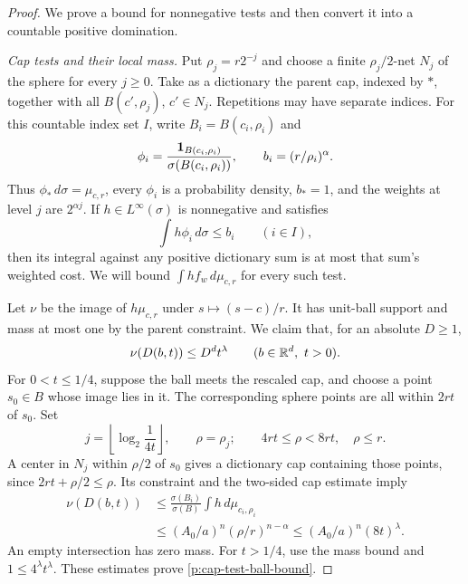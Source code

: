 \begin{proof}
We prove a bound for nonnegative tests and then convert it into a
countable positive domination.

\smallskip\noindent
\emph{Cap tests and their local mass.}
Put $\rho_j=r2^{-j}$ and choose a finite $\rho_j/2$-net $N_j$ of the
sphere for every $j\ge0$. Take as a dictionary the parent cap, indexed
by $*$, together with all $B(c',\rho_j)$, $c'\in N_j$. Repetitions may
have separate indices. For this countable index set $I$, write
$B_i=B(c_i,\rho_i)$ and
\[
 \phi_i=\frac{\mathbf 1_{B(c_i,\rho_i)}}{\sigma(B(c_i,\rho_i))},
 \qquad b_i=(r/\rho_i)^\alpha.
\]
Thus $\phi_*\,d\sigma=\mu_{c,r}$, every $\phi_i$ is a probability
density, $b_*=1$, and the weights at level $j$ are $2^{\alpha j}$.
If $h\in L^\infty(\sigma)$ is nonnegative and satisfies
\begin{equation}\label{p:cap-dual-constraints}
 \int h\phi_i\,d\sigma\le b_i\qquad(i\in I),
\end{equation}
then its integral against any positive dictionary sum is at most that
sum's weighted cost. We will bound $\int h f_w\,d\mu_{c,r}$ for every
such test.

Let $\nu$ be the image of $h\mu_{c,r}$ under $s\mapsto(s-c)/r$.
It has unit-ball support and mass at most one by the parent constraint.
We claim that, for an absolute $D\ge1$,
\begin{equation}\label{p:cap-test-ball-bound}
 \nu(D(b,t))\le D^d t^\lambda
 \qquad(b\in\mathbb R^d,\ t>0).
\end{equation}
For $0<t\le1/4$, suppose the ball meets the rescaled cap, and choose a
point $s_0\in B$ whose image lies in it. The corresponding sphere points
are all within $2rt$ of $s_0$. Set
\[
 j=\left\lfloor\log_2\frac1{4t}\right\rfloor,\qquad \rho=\rho_j;
 \qquad 4rt\le\rho<8rt,\quad \rho\le r.
\]
A center in $N_j$ within $\rho/2$ of $s_0$ gives a dictionary cap
containing those points, since $2rt+\rho/2\le\rho$. Its constraint and
the two-sided cap estimate imply
\begin{align*}
 \nu(D(b,t))
 &\le\frac{\sigma(B_i)}{\sigma(B)}\int h\,d\mu_{c_i,\rho_i}\\
 &\le(A_0/a)^n(\rho/r)^{n-\alpha}
 \le(A_0/a)^n(8t)^\lambda.
\end{align*}
An empty intersection has zero mass. For
$t>1/4$, use the mass bound and $1\le4^\lambda t^\lambda$.
These estimates prove \eqref{p:cap-test-ball-bound}.


\end{proof}
